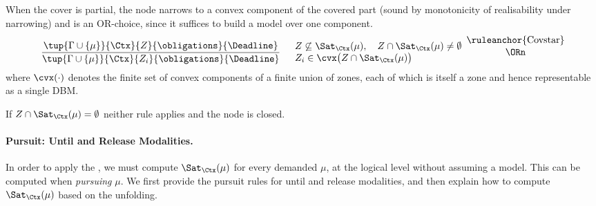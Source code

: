 When the cover is partial, the node narrows to a convex component of the covered part (sound by monotonicity of realisability under narrowing) and is an OR-choice, since it suffices to build a model over one component.
\vspace{-0.1cm}
\[
\frac{\tup{\Gamma\cup\{\mu\}}{\Ctx}{Z}{\obligations}{\Deadline}}
{\tup{\Gamma\cup\{\mu\}}{\Ctx}{Z_i}{\obligations}{\Deadline}}
\quad
\begin{array}{l}
Z\not\subseteq\Sat_{\Ctx}(\mu),\quad Z\cap\Sat_{\Ctx}(\mu)\neq\emptyset\\
Z_i\in\cvx\big(Z\cap\Sat_{\Ctx}(\mu)\big)
\end{array}
\shortstack{\ruleanchor{Covstar}\\\ORn}
\]
where $\cvx(\cdot)$ denotes the finite set of convex components of a finite union of zones, each of which
is itself a zone and hence representable as a single DBM. 

If $Z\cap\Sat_{\Ctx}(\mu)=\emptyset$ neither rule applies and the node is closed. 





\paragraph{Pursuit: Until and Release Modalities.}

In order to apply the , we must compute $\Sat_{\Ctx}(\mu)$ for every demanded $\mu$, at the logical level without assuming a model. This can be computed when \emph{pursuing} $\mu$. We first provide the pursuit rules for until and release modalities, and then explain how to compute $\Sat_{\Ctx}(\mu)$ based on the unfolding.





%
%



